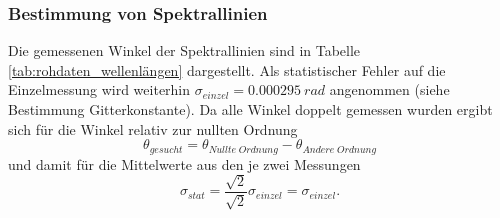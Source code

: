 \documentclass[12pt,a4paper]{article}
\begin{document}
	\subsubsection{Bestimmung von Spektrallinien}
	
	Die gemessenen Winkel der Spektrallinien sind in Tabelle \ref{tab:rohdaten_wellenlängen} dargestellt. Als statistischer Fehler auf die Einzelmessung wird weiterhin $\sigma_{einzel} = \SI{0.000295}{rad}$ angenommen (siehe Bestimmung Gitterkonstante). Da alle Winkel doppelt gemessen wurden ergibt sich für die Winkel relativ zur nullten Ordnung
	\begin{equation}
	\theta_{gesucht} = \theta_{Nullte\;Ordnung} - \theta_{Andere\;Ordnung}
	\end{equation}
	und damit für die Mittelwerte aus den je zwei Messungen
	\begin{equation}
	\sigma_{stat} = \frac{\sqrt{2}}{\sqrt{2}} \sigma_{einzel} = \sigma_{einzel}.
	\end{equation}
\end{document}

